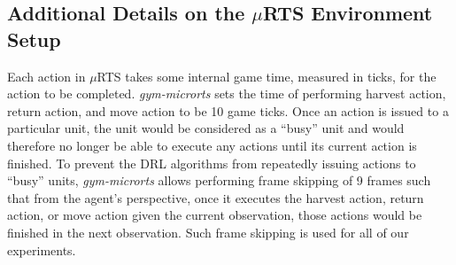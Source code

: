 \documentclass[letterpaper]{article}
\begin{document}


\subsection{Additional Details on the $\mu$RTS Environment Setup}
\label{appendix:additional-detals-murts}
Each action in $\mu$RTS takes some internal game time, measured in ticks, for the action to be completed. \emph{gym-microrts} \cite{huang2019comparing} sets the time of performing harvest action, return action, and move action to be 10 game ticks. Once an action is issued to a particular unit, the unit would be considered as a ``busy'' unit and would therefore no longer be able to execute any actions until its current action is finished. To prevent the DRL algorithms from repeatedly issuing actions to ``busy'' units, \emph{gym-microrts} allows performing frame skipping of 9 frames such that from the agent's perspective, once it executes the harvest action, return action, or move action given the current observation, those actions would be finished in the next observation. Such frame skipping is used for all of our experiments.
\end{document}
